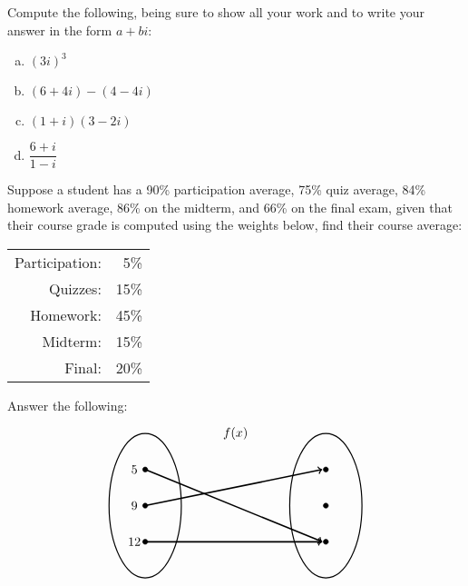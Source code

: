 \documentclass[12pt,letterpaper]{exam}
\begin{document}
\begin{questions}
\newpage



\question[8] Compute the following, being sure to show all your work and to write your answer in the form $a + bi$: \pspace
	\begin{enumerate}[(a)]
	\item $(3i)^3$ \vfill
	\item $(6 + 4i) - (4 - 4i)$ \vfill
	\item $(1 + i)(3 - 2i)$ \vfill
	\item $\dfrac{6 + i}{1 - i}$ \vfill
	\end{enumerate}



\newpage



\question[8] Suppose a student has a 90\% participation average, 75\% quiz average, 84\% homework average, 86\% on the midterm, and 66\% on the final exam, given that their course grade is computed using the weights below, find their course average:
	\begin{table}[!ht]
	\centering
	\begin{tabular}{rr}
	Participation: & 5\% \\
	Quizzes: & 15\% \\
	Homework: & 45\% \\
	Midterm: & 15\% \\
	Final: & 20\%
	\end{tabular}
	\end{table}



\newpage



\question[8] Answer the following:
	\[
	\begin{tikzpicture}
	\node at (2.5,2) {$f(x)$};
	\draw[line width=0.03cm] (0,0) circle (1 and 2);
	\draw[line width=0.03cm] (5,0) circle (1 and 2);
	
	\draw[fill=black] (0,1) circle (0.07);
	\draw[fill=black] (0,0) circle (0.07);
	\draw[fill=black] (0,-1) circle (0.07);
	
	\draw[fill=black] (5,1) circle (0.07);
	\draw[fill=black] (5,0) circle (0.07);
	\draw[fill=black] (5,-1) circle (0.07);
	
	\draw[line width=0.04cm,->] (0,1) -- (4.9,-1);
	\draw[line width=0.04cm,->] (0,0) -- (4.9,1);
	\draw[line width=0.04cm,->] (0,-1) -- (4.9,-1);
	
	\node at (-0.3,1) {$5$};
	\node at (-0.3,0) {$9$};
	\node at (-0.3,-1) {$12$};
	

\end{tikzpicture}\]
\end{questions}
\end{document}
